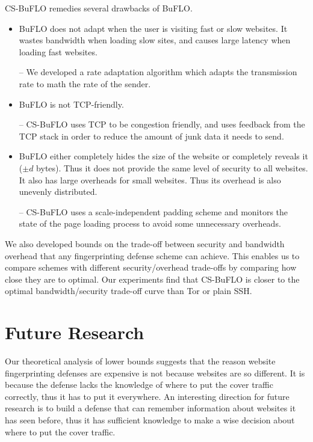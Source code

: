 \documentclass[11pt,oneside]{article}
\newcommand{\buflo} {BuFLO\xspace}
\newcommand{\csb} {CS-BuFLO\xspace}
\begin{document}
\csb remedies several drawbacks of \buflo.
\begin{itemize}

\item
\buflo does not adapt when the user is visiting fast or slow websites. It
wastes bandwidth when loading slow sites, and causes large latency when loading
fast websites.

-- We developed a rate adaptation algorithm which adapts the
transmission rate to math the rate of the sender.

\item
\buflo is not TCP-friendly.

-- \csb uses TCP to be congestion friendly, and
uses feedback from the TCP stack in order to reduce the amount of junk data it
needs to send.

\item
\buflo either completely hides the size of the website or completely reveals it
($\pm d$ bytes).  Thus it does not provide the same level of security to all
websites. It also has large overheads for small websites.  Thus its overhead is
also unevenly distributed.

-- \csb uses a scale-independent padding scheme and
monitors the state of the page loading process to avoid some unnecessary
overheads.

\end{itemize}

We also developed bounds on the trade-off between security and bandwidth overhead that
any fingerprinting defense scheme can achieve. This enables us to compare
schemes with different security/overhead trade-offs by comparing how close they
are to optimal. Our experiments find that \csb is closer to the optimal
bandwidth/security trade-off curve than Tor or plain SSH.

\section{Future Research}

Our theoretical analysis of lower bounds suggests that the reason website
fingerprinting defenses are expensive is not because websites are so different.
It is because the defense lacks the knowledge of where to put the cover traffic
correctly, thus it has to put it everywhere. An interesting direction for
future research is to build a defense that can remember information about
websites it has seen before, thus it has sufficient knowledge to make a wise
decision about where to put the cover traffic.
\end{document}

